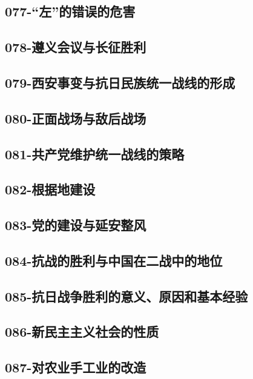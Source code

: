 \subsection{077-“左”的错误的危害}

\subsection{078-遵义会议与长征胜利}

\subsection{079-西安事变与抗日民族统一战线的形成}

\subsection{080-正面战场与敌后战场}

\subsection{081-共产党维护统一战线的策略}

\subsection{082-根据地建设}

\subsection{083-党的建设与延安整风}

\subsection{084-抗战的胜利与中国在二战中的地位}

\subsection{085-抗日战争胜利的意义、原因和基本经验}

\subsection{086-新民主主义社会的性质}

\subsection{087-对农业手工业的改造}

